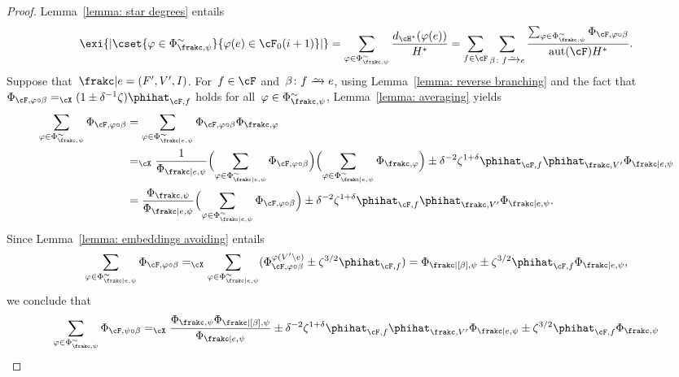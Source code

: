\documentclass[11pt]{amsart}
\DeclarePairedDelimiter{\paren}{\lparen}{\rparen}
\DeclarePairedDelimiter{\abs}{\lvert}{\rvert}
\newcommand{\Xeq}{=_{\cX}}
\def\phi{\varphi}
\newcommand{\bijection}{\mathchoice
	{\xrightarrow{\smash{\raisebox{-3pt}{$\scriptstyle\sim$}}}}%
	{\xrightarrow{\smash{\raisebox{-3pt}{$\scriptstyle\sim$}}}}%
	{\xrightarrow{\smash{\raisebox{-2.5pt}{$\scriptscriptstyle\sim$}}}}%
	{\xrightarrow{\smash{\raisebox{-2.5pt}{$\scriptscriptstyle\sim$}}}}%
}
\DeclareMathOperator{\aut}{aut}
\theoremstyle{definition}
\numberwithin{equation}{section}
\begin{document}
	\begin{proof}
		Lemma~\ref{lemma: star degrees} entails
		\begin{equation}\label{equation: chain loss at one edge using degree}
			\exi{\abs{\cset{ \phi\in\Phi^\sim_{\frakc,\psi} }{ \phi(e)\in \cF_0(i+1) }}}
			= \sum_{\phi\in\Phi^\sim_{\frakc,\psi} } \frac{d_{\cH^*}(\phi(e))}{H^*}
			=\sum_{f\in\cF}\sum_{\beta\colon f\bijection e}\frac{\sum_{\phi\in\Phi^\sim_{\frakc,\psi} } \Phi_{\cF,\phi\circ\beta}}{\aut(\cF)H^*}.
		\end{equation}
		Suppose that~$\frakc|e=(F',V',I)$.
		For~$f\in\cF$ and~$\beta\colon f\bijection e$, using Lemma~\ref{lemma: reverse branching} and the fact that~$\Phi_{\cF,\phi\circ\beta}\Xeq (1\pm \delta^{-1}\zeta)\phihat_{\cF,f}$ holds for all~$\phi\in\Phi_{\frakc,\psi}^\sim$, Lemma~\ref{lemma: averaging} yields
		\begin{equation*}
			\begin{aligned}
				\sum_{\phi\in\Phi^\sim_{\frakc,\psi} } \Phi_{\cF,\phi\circ\beta}
				&= \sum_{\phi\in\Phi^\sim_{\frakc|e,\psi} } \Phi_{\cF,\phi\circ\beta}\Phi_{\frakc,\phi}\\
				&\Xeq \frac{1}{\Phi_{\frakc|e,\psi}}\paren[\Big]{\sum_{\phi\in\Phi^\sim_{\frakc|e,\psi} } \Phi_{\cF,\phi\circ\beta}}\paren[\Big]{\sum_{\phi\in\Phi^\sim_{\frakc|e,\psi} }\Phi_{\frakc,\phi}}\pm \delta^{-2}\zeta^{1+\delta}\phihat_{\cF,f}\phihat_{\frakc,V'}\Phi_{\frakc|e,\psi}\\
				&=\frac{\Phi_{\frakc,\psi}}{\Phi_{\frakc|e,\psi}}\paren[\Big]{\sum_{\phi\in\Phi^\sim_{\frakc|e,\psi} } \Phi_{\cF,\phi\circ\beta}}\pm \delta^{-2}\zeta^{1+\delta}\phihat_{\cF,f}\phihat_{\frakc,V'}\Phi_{\frakc|e,\psi}.
			\end{aligned}
		\end{equation*}
		Since Lemma~\ref{lemma: embeddings avoiding} entails
		\begin{equation*}
			\sum_{\phi\in\Phi^\sim_{\frakc|e,\psi}}\Phi_{\cF,\phi\circ\beta}
			\Xeq \sum_{\phi\in\Phi^\sim_{\frakc|e,\psi}}(\Phi_{\cF,\phi\circ\beta}^{\phi(V'\setminus e)}\pm\zeta^{3/2}\phihat_{\cF,f})
			=\Phi_{\frakc|[\beta],\psi}\pm\zeta^{3/2}\phihat_{\cF,f}\Phi_{\frakc|e,\psi},
		\end{equation*}
		we conclude that
		\begin{equation*}
			\begin{aligned}
				\sum_{\phi\in\Phi^\sim_{\frakc,\psi} } \Phi_{\cF,\psi\circ\beta}
				&\Xeq\frac{\Phi_{\frakc,\psi}\Phi_{\frakc|[\beta],\psi}}{\Phi_{\frakc|e,\psi}}\pm \delta^{-2}\zeta^{1+\delta}\phihat_{\cF,f}\phihat_{\frakc,V'}\Phi_{\frakc|e,\psi}\pm \zeta^{3/2}\phihat_{\cF,f}\Phi_{\frakc,\psi}\\

\end{aligned}
\end{equation*}
\end{proof}
\end{document}

